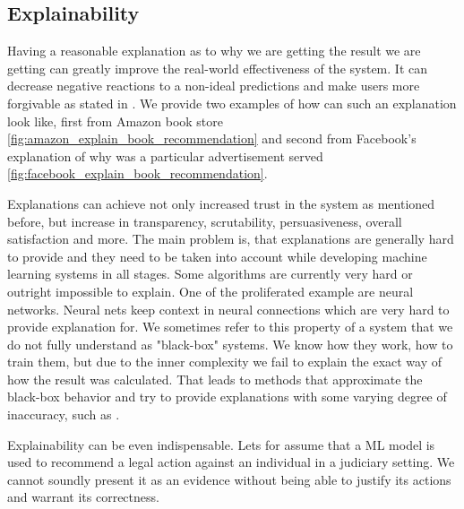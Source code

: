 
\subsection{Explainability}
Having a reasonable explanation as to why we are getting the result we are getting can greatly improve the real-world effectiveness of the system. It can decrease negative reactions to a non-ideal predictions and make users more forgivable as stated in \cite{tintarev2007survey}. We provide two examples of how can such an explanation look like, first from Amazon book store \ref{fig:amazon_explain_book_recommendation} and second from Facebook's explanation of why was a particular advertisement served \ref{fig:facebook_explain_book_recommendation}.

Explanations can achieve not only increased trust in the system as mentioned before, but increase in transparency, scrutability, persuasiveness, overall satisfaction and more. The main problem is, that explanations are generally hard to provide and they need to be taken into account while developing machine learning systems in all stages. Some algorithms are currently very hard or outright impossible to explain. One of the proliferated example are neural networks. Neural nets keep context in neural connections which are very hard to provide explanation for. We sometimes refer to this property of a system that we do not fully understand as "black-box" systems. We know how they work, how to train them, but due to the inner complexity we fail to explain the exact way of how the result was calculated. That leads to methods that approximate the black-box behavior and try to provide explanations with some varying degree of inaccuracy, such as \cite{explaining_black_box_2021}.

Explainability can be even indispensable. Lets for assume that a ML model is used to recommend a legal action against an individual in a judiciary setting. We cannot soundly present it as an evidence without being able to justify its actions and warrant its correctness.


